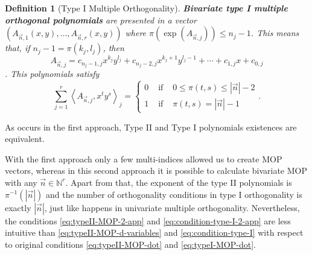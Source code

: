 \documentclass[12pt,a4]{report}
\theoremstyle{plain}
\newtheorem{definition}[theorem]{Definition}
\newcommand{\N}[0]{\mathbb{N}}
\newcommand{\prodesc}[2]{\left\langle #1 , #2 \right\rangle}
\begin{document}
\begin{definition}[Type I Multiple Orthogonality]
  \textbf{Bivariate type I multiple orthogonal polynomials} are presented in a vector $(A_{\vec n,1}(x,y),\dots,A_{\vec n,r}(x,y))$ where $\pi(\exp(A_{\vec n,j})) \leq n_j-1$. This means that, if $n_j-1 = \pi(k_j,l_j)$, then $$A_{\vec n,j} = c_{n_j-1,j} x^{k_j}y^{l_j}+ c_{n_j-2,j}x^{k_j+1}y^{l_j-1} +\cdots +c_{1,j} x + c_{0,j}$$. This polynomials satisfy
  \begin{equation}
    \label{eq:condition-type-I-2-app}
    \boxed{\sum_{j=1}^r \prodesc{A_{\vec n,j}}{x^t y^s}_j = \left\{\begin{array}{ccl}
        0 &   \text{ if } & 0\leq \pi(t,s)\leq |\vec n|-2 \\
        1 & \text{ if } & \pi(t,s)= |\vec n|-1     
    \end{array}\right.}.
  \end{equation}
\end{definition}

  As occurs in the first approach, Type II and Type I polynomials existences are equivalent. %
%
%  

  With the first approach only a few multi-indices allowed us to create MOP vectors, whereas in this second approach it is possible to calculate bivariate MOP with any $\vec n\in\N^r$. Apart from that, the exponent of the type II polynomials is $\pi^{-1}(|\vec n|)$ and the number of orthogonality conditions in type I orthogonality is exactly $|\vec n|$, just like happens in univariate multiple orthogonality. Nevertheless, the conditions \eqref{eq:typeII-MOP-2-app} and \eqref{eq:condition-type-I-2-app} are less intuitive than \eqref{eq:typeII-MOP-d-variables} and \eqref{eq:condition-type-I} with respect to original conditions \eqref{eq:typeII-MOP-dot} and \eqref{eq:typeI-MOP-dot}.








\nocite{*}
{}

\end{document}
